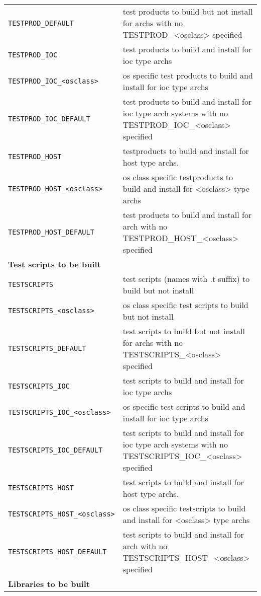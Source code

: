 \begin{center}
\begin{longtable}{p{2.94784in}p{3.76247in}}
\verb|TESTPROD_DEFAULT| & test products to build but not install for archs with no TESTPROD\_\textless{}osclass\textgreater{} specified\\
\verb|TESTPROD_IOC| & test products to build and install for ioc type archs\\
\verb|TESTPROD_IOC_<osclass>| & os specific test products to build and install for ioc type archs\\
\verb|TESTPROD_IOC_DEFAULT| & test products to build and install for ioc type arch systems with no TESTPROD\_IOC\_\textless{}osclass\textgreater{} specified\\
\verb|TESTPROD_HOST| & testproducts to build and install for host type archs. \\
\verb|TESTPROD_HOST_<osclass>| & os class specific testproducts to build and install for \textless{}osclass\textgreater{} type archs\\
\verb|TESTPROD_HOST_DEFAULT| & test products to build and install for arch with no TESTPROD\_HOST\_\textless{}osclass\textgreater{} specified\\
\textbf{Test scripts to be built} & \\
\hline
\verb|TESTSCRIPTS| & test scripts (names with .t suffix) to build but not install\\
\verb|TESTSCRIPTS_<osclass>| & os class specific test scripts to build but not install\\
\verb|TESTSCRIPTS_DEFAULT| & test scripts to build but not install for archs with no TESTSCRIPTS\_\textless{}osclass\textgreater{} specified\\
\verb|TESTSCRIPTS_IOC| & test scripts to build and install for ioc type archs\\
\verb|TESTSCRIPTS_IOC_<osclass>| & os specific test scripts to build and install for ioc type archs\\
\verb|TESTSCRIPTS_IOC_DEFAULT| & test scripts to build and install for ioc type arch systems with no TESTSCRIPTS\_IOC\_\textless{}osclass\textgreater{} specified\\
\verb|TESTSCRIPTS_HOST| & test scripts to build and install for host type archs. \\
\verb|TESTSCRIPTS_HOST_<osclass>| & os class specific testscripts to build and install for \textless{}osclass\textgreater{} type archs\\
\verb|TESTSCRIPTS_HOST_DEFAULT| & test scripts to build and install for arch with no TESTSCRIPTS\_HOST\_\textless{}osclass\textgreater{} specified\\
\textbf{Libraries to be built} & \\

\end{longtable}
\end{center}
